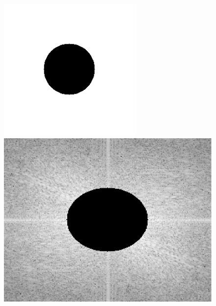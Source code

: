 \begin{figure}[H]
\begin{minipage}[b]{.15\textwidth}
    \end{minipage}
    \begin{minipage}[b]{.15\textwidth}
        \centering
        \includegraphics[keepaspectratio,width=\textwidth]{../../Figures/08_41_filter.pdf}
    \end{minipage}
    \begin{minipage}[b]{.15\textwidth}
        \centering
        \includegraphics[keepaspectratio,width=\textwidth]{../../Figures/08_43_fft-filter.pdf}

\end{minipage}
\end{figure}
